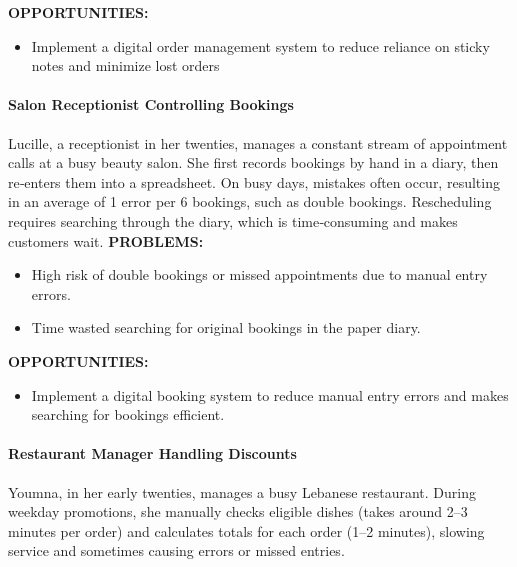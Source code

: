 \documentclass[]{VUMIFTemplateClass}
\newcommand{\todocomment}[1]{%
    \begin{tcolorbox}[colback=red!20, colframe=red!60, arc=0pt, outer arc=0pt, boxrule=1pt, left=3pt, right=3pt, top=3pt, bottom=3pt]
        \textbf{\textcolor{orange!70!black}{TODO:}} #1
    \end{tcolorbox}
}
\newcommand{\subsubsubsection}[1]{\paragraph{#1}}
\begin{document}
\textbf{OPPORTUNITIES:}

\begin{itemize}
    \item Implement a digital order management system to reduce reliance on sticky notes and minimize lost orders
\end{itemize}



\subsubsubsection{Salon Receptionist Controlling Bookings}
\label{subsubsubsec:salon-receptionist}

Lucille, a receptionist in her twenties, manages a constant stream of appointment calls at a busy beauty salon. She first records bookings by hand in a diary, then re‑enters them into a spreadsheet. On busy days, mistakes often occur, resulting in an average of 1 error per 6 bookings, such as double bookings. Rescheduling requires searching through the diary, which is time‑consuming and makes customers wait. 
\textbf{PROBLEMS:}

\begin{itemize}
    \item High risk of double bookings or missed appointments due to manual entry errors.
    \item Time wasted searching for original bookings in the paper diary.
\end{itemize}

\textbf{OPPORTUNITIES:}
\begin{itemize}
    \item Implement a digital booking system to reduce manual entry errors and
    makes searching for bookings efficient.
\end{itemize}


\subsubsubsection{Restaurant Manager Handling Discounts}
\label{subsubsubsec:restaurant-discounts}

Youmna, in her early twenties, manages a busy Lebanese restaurant. During weekday promotions, she manually checks eligible dishes (takes around 2–3 minutes per order) and calculates totals for each order (1–2 minutes), slowing service and sometimes causing errors or missed entries.
\end{document}
